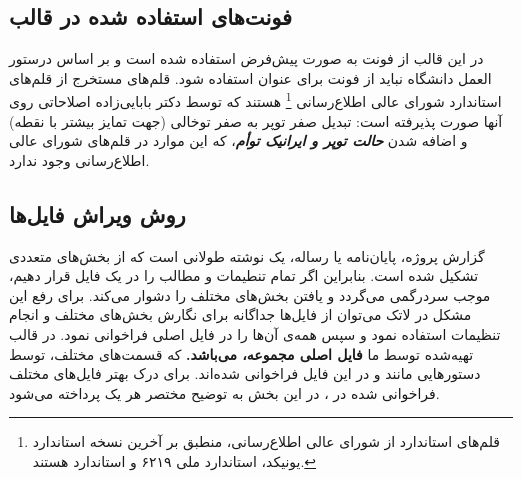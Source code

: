\subsection{فونت‌های استفاده شده در قالب}
در این قالب از فونت‌
به صورت پیش‌فرض استفاده شده است و بر اساس درستور العمل دانشگاه نباید از فونت
برای عنوان استفاده شود.
قلم‌های
مستخرج از قلم‌های استاندارد
شورای عالی اطلاع‌رسانی%
\footnote{
قلم‌های استاندارد
از شورای عالی اطلاع‌رسانی، منطبق بر آخرین نسخه استاندارد یونیکد، استاندارد ملی ۶۲۱۹ و استاندارد
هستند.
}
هستند که توسط دکتر بابایی‌زاده اصلاحاتی روی آنها صورت پذیرفته است: تبدیل صفر توپر به صفر توخالی (جهت تمایز بیشتر با نقطه) و اضافه شدن
\textit{\textbf{حالت توپر و ایرانیک توأم}}،
که این موارد در قلم‌های شورای عالی اطلاع‌رسانی وجود ندارد.


\subsection{روش ویراش فایل‌ها}\label{sec:edit}
گزارش پروژه، پایان‌نامه یا رساله، یک نوشته طولانی است که از بخش‌های متعددی تشکیل شده است. بنابراین اگر تمام تنطیمات و مطالب را در یک فایل قرار دهیم، موجب سردرگمی می‌گردد و یافتن بخش‌های مختلف را دشوار می‌کند. برای رفع این مشکل در لاتک می‌توان از فایل‌ها جداگانه برای نگارش بخش‌های مختلف و انجام تنظیمات استفاده نمود و سپس همه‌ی آن‌ها را در فایل اصلی فراخوانی نمود.
در قالب تهیه‌شده توسط ما  
\textbf{
	فایل اصلی مجموعه،
	می‌باشد.
}
که قسمت‌های مختلف، توسط دستورهایی مانند 
و
در این فایل فراخوانی شده‌اند.
برای درک بهتر فایل‌های مختلف فراخوانی شده در
،
در این بخش به توضیح مختصر هر یک پرداخته می‌شود.

